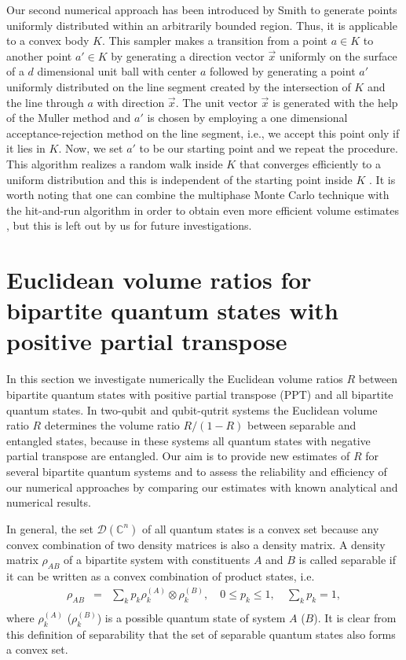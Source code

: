 \documentclass[12pt]{iopart}
\begin{document}
Our second numerical approach has been introduced by Smith \cite{Smith} to generate points uniformly distributed within an arbitrarily bounded region. Thus, it is applicable to a convex body $K$.
This sampler makes a transition from a point $a \in K$ to another point $a' \in K$ by generating a direction vector $\vec{x}$ uniformly on the surface of a $d$ dimensional unit ball 
with center $a$ followed by generating a point $a'$ uniformly distributed on the line segment created by the intersection of $K$ and the line through $a$ with direction $\vec{x}$. 
The unit vector $\vec{x}$ is generated with the 
help of the Muller method and $a'$ is chosen by employing a one dimensional acceptance-rejection method on the line segment, i.e., we accept this point only if it lies in $K$. Now, we set $a'$ to be our starting 
point and we repeat the procedure. This algorithm realizes a random walk inside $K$ 
that converges efficiently to a uniform distribution and this is independent of the starting point inside $K$ \cite{LovaszV}. 
It is worth noting that one can combine the multiphase Monte Carlo technique with the hit-and-run algorithm in order to obtain even more efficient volume 
estimates \cite{LovaszV2}, but this is left out by us for future investigations.


\section{Euclidean volume ratios for bipartite quantum states with positive partial transpose}

\label{III}


In this section
we investigate numerically the Euclidean volume ratios $R$ between bipartite quantum states with positive partial transpose (PPT) and all bipartite quantum states. 
In two-qubit and qubit-qutrit systems the Euclidean volume ratio $R$ determines the volume 
ratio $R/(1-R)$ between separable and entangled states, because in these systems all quantum states with negative partial transpose are entangled. 
Our aim is to provide new estimates of $R$ for several bipartite quantum systems and to assess the reliability and efficiency of 
our numerical approaches by comparing our estimates with known analytical and numerical results.


In general, the set $\mathcal{D}(\mathbb{C}^n)$ of all quantum states is a convex set because
any convex combination of two density matrices is also a
density matrix. A density matrix $\rho_{AB}$ of a bipartite system with constituents $A$ and $B$ is called separable if it can be written as a convex combination of product states, i.e.
\begin{eqnarray}
 \rho_{AB}&=&\sum_k p_k \rho^{(A)}_k \otimes \rho^{(B)}_k, \quad 0\leqslant p_k \leqslant1,\quad \sum_k p_k=1,
 \nonumber\\
\end{eqnarray}
where $\rho^{(A)}_k$ ($\rho^{(B)}_k$) is a possible quantum state of system $A$ ($B$). It is clear from this definition of separability that the set of separable quantum states also forms a convex set.
\end{document}
